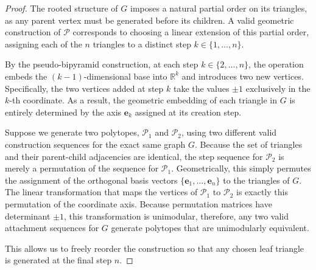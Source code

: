 \documentclass[a4paper,11pt,reqno]{amsart}
\begin{document}
\begin{proof}
The rooted structure of $G$ imposes a natural partial order on its triangles, as any parent vertex must be generated before its children. 
A valid geometric construction of $\mathcal{P}$ corresponds to choosing a linear extension of this partial order, assigning each of the 
$n$ triangles to a distinct step $k \in \{1, \dots, n\}$.
		
By the pseudo-bipyramid construction, at each step $k \in \{ 2, \dots, n \}$, the operation embeds the $(k-1)$-dimensional base into 
$\mathbb{R}^{k}$ and introduces two new vertices. Specifically, the two vertices added at step $k$ take the values $\pm 1$ exclusively 
in the $k$-th coordinate. As a result, the geometric embedding of each triangle in $G$ is entirely determined by the axis $\bm{e}_{k}$ 
assigned at its creation step.
		
Suppose we generate two polytopes, $\mathcal{P}_1$ and $\mathcal{P}_2$, using two different valid construction sequences for the 
exact same graph $G$. Because the set of triangles and their parent-child adjacencies are identical, the step sequence for 
$\mathcal{P}_2$ is merely a permutation of the sequence for $\mathcal{P}_1$. Geometrically, this simply permutes the assignment 
of the orthogonal basis vectors $\{\bm{e}_1, \dots, \bm{e}_n\}$ to the triangles of $G$. The linear transformation that maps the vertices 
of $\mathcal{P}_1$ to $\mathcal{P}_2$ is exactly this permutation of the coordinate axis. Because permutation matrices have determinant 
$\pm 1$, this transformation is unimodular, therefore, any two valid attachment sequences for $G$ generate polytopes that are unimodularly 
equivalent.
		
This allows us to freely reorder the construction so that any chosen leaf triangle is generated at the final step $n$.
\end{proof}
\end{document}
